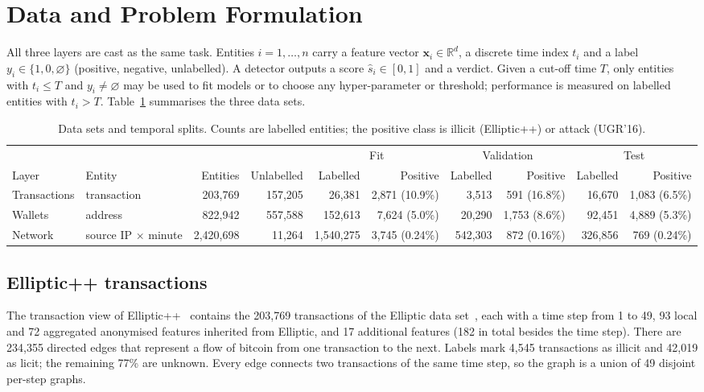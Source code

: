 \section{Data and Problem Formulation}\label{sec:data}

All three layers are cast as the same task. Entities $i = 1, \dots, n$ carry a feature vector $\mathbf{x}_i \in \mathbb{R}^d$, a discrete time index $t_i$ and a label $y_i \in \{1, 0, \varnothing\}$ (positive, negative, unlabelled). A detector outputs a score $\hat{s}_i \in [0,1]$ and a verdict. Given a cut-off time $T$, only entities with $t_i \le T$ and $y_i \neq \varnothing$ may be used to fit models or to choose any hyper-parameter or threshold; performance is measured on labelled entities with $t_i > T$. Table~\ref{tab:data} summarises the three data sets.

\begin{table}[t]
\caption{Data sets and temporal splits. Counts are labelled entities; the positive class is illicit (Elliptic++) or attack (UGR'16).}\label{tab:data}
\centering
\begin{tabular}{llrrrrrrrr}
\toprule
 & & & & \multicolumn{2}{c}{Fit} & \multicolumn{2}{c}{Validation} & \multicolumn{2}{c}{Test} \\
\cmidrule(lr){5-6}\cmidrule(lr){7-8}\cmidrule(lr){9-10}
Layer & Entity & Entities & Unlabelled & Labelled & Positive & Labelled & Positive & Labelled & Positive \\
\midrule
Transactions & transaction & 203,769 & 157,205 & 26,381 & 2,871 (10.9\%) & 3,513 & 591 (16.8\%) & 16,670 & 1,083 (6.5\%) \\
Wallets & address & 822,942 & 557,588 & 152,613 & 7,624 (5.0\%) & 20,290 & 1,753 (8.6\%) & 92,451 & 4,889 (5.3\%) \\
Network & source IP $\times$ minute & 2,420,698 & 11,264 & 1,540,275 & 3,745 (0.24\%) & 542,303 & 872 (0.16\%) & 326,856 & 769 (0.24\%) \\
\bottomrule
\end{tabular}
\end{table}

\subsection{Elliptic++ transactions}
The transaction view of Elliptic++~\cite{elmougy2023} contains the 203,769 transactions of the Elliptic data set~\cite{weber2019}, each with a time step from 1 to 49, 93 local and 72 aggregated anonymised features inherited from Elliptic, and 17 additional features (182 in total besides the time step). There are 234,355 directed edges that represent a flow of bitcoin from one transaction to the next. Labels mark 4,545 transactions as illicit and 42,019 as licit; the remaining 77\% are unknown. Every edge connects two transactions of the same time step, so the graph is a union of 49 disjoint per-step graphs.

